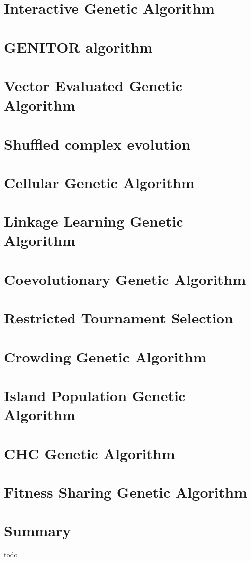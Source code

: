 \section{Interactive Genetic Algorithm}
\section{GENITOR algorithm}
\section{Vector Evaluated Genetic Algorithm}
\section{Shuffled complex evolution}
\section{Cellular Genetic Algorithm}
\section{Linkage Learning Genetic Algorithm}
\section{Coevolutionary Genetic Algorithm}
\section{Restricted Tournament Selection}

\section{Crowding Genetic Algorithm}
\section{Island Population Genetic Algorithm}
\section{CHC Genetic Algorithm}
\section{Fitness Sharing Genetic Algorithm}

\section{Summary}
todo
